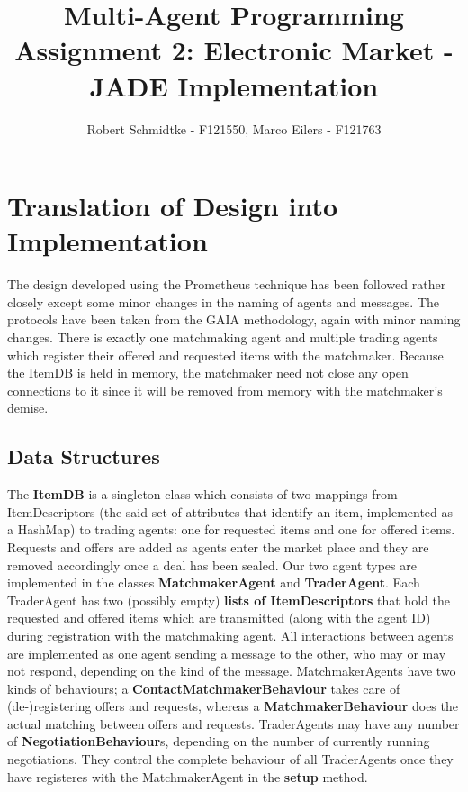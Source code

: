 \documentclass[a4paper,11pt]{article}
\begin{document}
\title{Multi-Agent Programming\\Assignment 2: Electronic Market - JADE Implementation}
\author{Robert Schmidtke - F121550, Marco Eilers - F121763}

\maketitle
\newpage

\section{Translation of Design into Implementation}
The design developed using the Prometheus technique has been followed rather closely except some minor changes in the naming of agents and messages. The protocols have been taken from the GAIA methodology, again with minor naming changes. There is exactly one matchmaking agent and multiple trading agents which register their offered and requested items with the matchmaker. Because the ItemDB is held in memory, the matchmaker need not close any open connections to it since it will be removed from memory with the matchmaker's demise.

\subsection{Data Structures}
The \textbf{ItemDB} is a singleton class which consists of two mappings from ItemDescriptors (the said set of attributes that identify an item, implemented as a HashMap) to trading agents: one for requested items and one for offered items. Requests and offers are added as agents enter the market place and they are removed accordingly once a deal has been sealed. Our two agent types are implemented in the classes \textbf{MatchmakerAgent} and \textbf{TraderAgent}. Each TraderAgent has two (possibly empty) \textbf{lists of ItemDescriptors} that hold the requested and offered items which are transmitted (along with the agent ID) during registration with the matchmaking agent. All interactions between agents are implemented as one agent sending a message to the other, who may or may not respond, depending on the kind of the message. MatchmakerAgents have two kinds of behaviours; a \textbf{ContactMatchmakerBehaviour} takes care of (de-)registering offers and requests, whereas a \textbf{MatchmakerBehaviour} does the actual matching between offers and requests. TraderAgents may have any number of \textbf{NegotiationBehaviour}s, depending on the number of currently running negotiations. They control the complete behaviour of all TraderAgents once they have registeres with the MatchmakerAgent in the \textbf{setup} method. 
\end{document}
